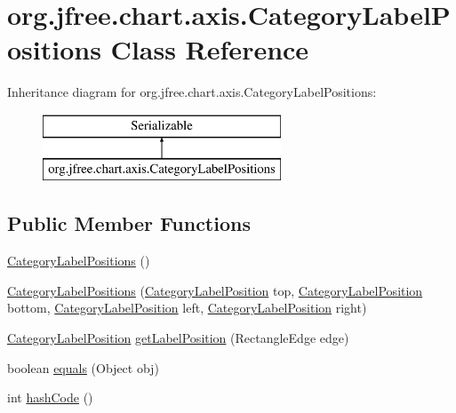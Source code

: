 \hypertarget{classorg_1_1jfree_1_1chart_1_1axis_1_1_category_label_positions}{}\section{org.\+jfree.\+chart.\+axis.\+Category\+Label\+Positions Class Reference}
\label{classorg_1_1jfree_1_1chart_1_1axis_1_1_category_label_positions}
Inheritance diagram for org.\+jfree.\+chart.\+axis.\+Category\+Label\+Positions\+:\begin{figure}[H]
\begin{center}
\leavevmode
\includegraphics[height=2.000000cm]{classorg_1_1jfree_1_1chart_1_1axis_1_1_category_label_positions}
\end{center}
\end{figure}
\subsection*{Public Member Functions}
\begin{DoxyCompactItemize}
\item 
\mbox{\hyperlink{classorg_1_1jfree_1_1chart_1_1axis_1_1_category_label_positions_ac51d8b208b46dc8f7e5adfd72534d801}{Category\+Label\+Positions}} ()
\item 
\mbox{\hyperlink{classorg_1_1jfree_1_1chart_1_1axis_1_1_category_label_positions_aa4cd6d8a36641044a8b123cf7c76016c}{Category\+Label\+Positions}} (\mbox{\hyperlink{classorg_1_1jfree_1_1chart_1_1axis_1_1_category_label_position}{Category\+Label\+Position}} top, \mbox{\hyperlink{classorg_1_1jfree_1_1chart_1_1axis_1_1_category_label_position}{Category\+Label\+Position}} bottom, \mbox{\hyperlink{classorg_1_1jfree_1_1chart_1_1axis_1_1_category_label_position}{Category\+Label\+Position}} left, \mbox{\hyperlink{classorg_1_1jfree_1_1chart_1_1axis_1_1_category_label_position}{Category\+Label\+Position}} right)
\item 
\mbox{\hyperlink{classorg_1_1jfree_1_1chart_1_1axis_1_1_category_label_position}{Category\+Label\+Position}} \mbox{\hyperlink{classorg_1_1jfree_1_1chart_1_1axis_1_1_category_label_positions_a6ffe0f8ad78bee09baee1743a8b43328}{get\+Label\+Position}} (Rectangle\+Edge edge)
\item 
boolean \mbox{\hyperlink{classorg_1_1jfree_1_1chart_1_1axis_1_1_category_label_positions_a464e01f3200acb32fd676e3ee0eb56a5}{equals}} (Object obj)
\item 
int \mbox{\hyperlink{classorg_1_1jfree_1_1chart_1_1axis_1_1_category_label_positions_a6f4f0831724cdbc69d917f0e87d91759}{hash\+Code}} ()
\end{DoxyCompactItemize}
